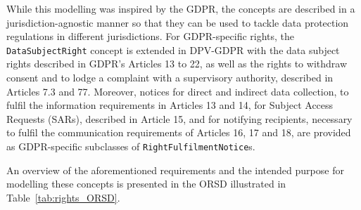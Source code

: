 While this modelling was inspired by the GDPR, the concepts are described in a jurisdiction-agnostic manner so that they can be used to tackle data protection regulations in different jurisdictions.
For GDPR-specific rights, the \texttt{DataSubjectRight} concept is extended in DPV-GDPR with the data subject rights described in GDPR's Articles 13 to 22, as well as the rights to withdraw consent and to lodge a complaint with a supervisory authority, described in Articles 7.3 and 77.
Moreover, notices for direct and indirect data collection, to fulfil the information requirements in Articles 13 and 14, for Subject Access Requests (SARs), described in Article 15, and for notifying recipients, necessary to fulfil the communication requirements of Articles 16, 17 and 18, are provided as GDPR-specific subclasses of \texttt{RightFulfilmentNotice}s.

An overview of the aforementioned requirements and the intended purpose for modelling these concepts is presented in the ORSD illustrated in Table~\ref{tab:rights_ORSD}.


